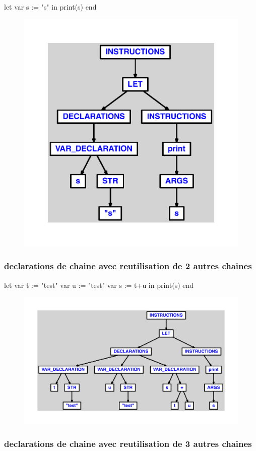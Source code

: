 \documentclass{article}
\begin{document}
\begin{verbatimtab}
let
	var s := "s"
in
	print(s)
end
\end{verbatimtab}
\begin{figure}[H]\centering\includegraphics[max width=\textwidth]{ast/ast_300.pdf}\end{figure}\subsubsection{declarations de chaine avec reutilisation de 2 autres chaines}
\begin{verbatimtab}
let
	var t := "test"
	var u := "test"
	var s := t+u
in
	print(s)
end
\end{verbatimtab}
\begin{figure}[H]\centering\includegraphics[max width=\textwidth]{ast/ast_301.pdf}\end{figure}\subsubsection{declarations de chaine avec reutilisation de 3 autres chaines}
\end{document}
